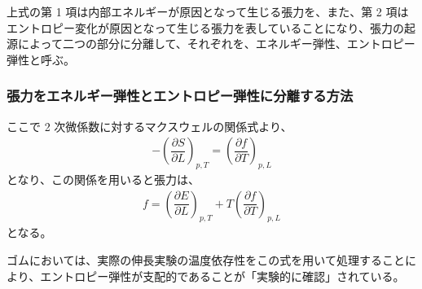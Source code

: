 \documentclass[a4paper,11pt]{ltjsarticle}
\newcommand{\difp}[2]{\dfrac{\partial #1}{\partial #2}}
\begin{document}
上式の第 1 項は内部エネルギーが原因となって生じる張力を、また、第 2 項はエントロピー変化が原因となって生じる張力を表していることになり、張力の起源によって二つの部分に分離して、それぞれを、エネルギー弾性、エントロピー弾性と呼ぶ。


\subsubsection{張力をエネルギー弾性とエントロピー弾性に分離する方法}

ここで 2 次微係数に対するマクスウェルの関係式より、
\begin{align*}
- \left( \difp{S}{L} \right)_{p, T} = \left( \difp{f}{T} \right)_{p, L}
\end{align*}
となり、この関係を用いると張力は、
\begin{align*}
f = \left( \difp{E}{L} \right)_{p, T} + T \left( \difp{f}{T} \right)_{p, L}
\end{align*}
となる。

ゴムにおいては、実際の伸長実験の温度依存性をこの式を用いて処理することにより、エントロピー弾性が支配的であることが「実験的に確認」されている。

%
%
%
%

\end{document}
